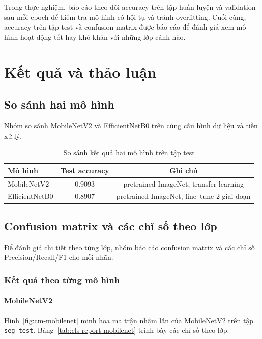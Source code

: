 \documentclass[12pt,a4paper]{article}
\newcommand{\accMobileNet}{0.9093}
\newcommand{\accEfficientNet}{0.8907}
\begin{document}
Trong thực nghiệm, báo cáo theo dõi accuracy trên tập huấn luyện và validation sau mỗi epoch để kiểm tra mô hình có hội tụ và tránh overfitting. Cuối cùng, accuracy trên tập test và confusion matrix được báo cáo để đánh giá xem mô hình hoạt động tốt hay khó khăn với những lớp cảnh nào.

\section{Kết quả và thảo luận}\label{sec:ket-qua}

\subsection{So sánh hai mô hình}
Nhóm so sánh MobileNetV2 và EfficientNetB0 trên cùng cấu hình dữ liệu và tiền xử lý.

\begin{table}[h]
\centering
\caption{So sánh kết quả hai mô hình trên tập test}
\label{tab:model-compare}
\begin{tabular}{lcc}
\toprule
\textbf{Mô hình} & \textbf{Test accuracy} & \textbf{Ghi chú}\\
\midrule
MobileNetV2 & \accMobileNet & pretrained ImageNet, transfer learning\\
EfficientNetB0 & \accEfficientNet & pretrained ImageNet, fine--tune 2 giai đoạn\\
\bottomrule
\end{tabular}
\end{table}

\subsection{Confusion matrix và các chỉ số theo lớp}
Để đánh giá chi tiết theo từng lớp, nhóm báo cáo confusion matrix và các chỉ số Precision/Recall/F1 cho mỗi nhãn.

\subsubsection{Kết quả theo từng mô hình}

\setcounter{figure}{0}
\setcounter{table}{0}

\paragraph{MobileNetV2}
Hình~\ref{fig:cm-mobilenet} minh hoạ ma trận nhầm lẫn của MobileNetV2 trên tập \texttt{seg\_test}. Bảng~\ref{tab:cls-report-mobilenet} trình bày các chỉ số theo lớp.
\end{document}
